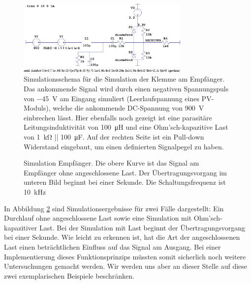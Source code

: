 \begin{figure}[h!tb]
    \centering
    \includegraphics[width=0.75\textwidth]{images/ltspice/jac/shortcircuit-recv.png}
    \caption{
        Simulationsschema f\"ur die Simulation  der Klemme am Empf\"anger. Das
        ankommende  Signal  wird  durch   einen  negativen  Spannungspuls  von
        \SI{-45}{\volt}   am   Eingang   simuliert   (Leerlaufspannung   eines
        PV-Moduls),  welche  die  ankommende DC-Spannung  von  \SI{900}{\volt}
        einbrechen   l\"asst. Hier    ebenfalls   noch   gezeigt    ist   eine
        parasit\"are    Leitungsinduktivit\"at   von    \SI{100}{\micro\henry}
        und   eine   Ohm'sch-kapazitive    Last   von   \SI{1}{\kilo\ohm}   ||
        \SI{100}{\micro\farad}. Auf  der  rechten   Seite  ist  ein  Pull-down
        Widerstand eingebaut, um einen definierten Signalpegel zu haben.%
    }
    \label{fig:ltspice:shortCircuit:receiver}
\end{figure}

\begin{figure}[h!tb]
    \centering
    
    \caption{%
        Simulation   Empf\"anger. Die   obere   Kurve  ist   das   Signal   am
        Empf\"anger  ohne  angeschlossene Last. Der  \"Ubertragungsvorgang  im
        unteren  Bild beginnt  bei einer  Sekunde. Die Schaltungsfrequenz  ist
        \SI{10}{\kilo\hertz}%
    }
    \label{fig:simu:short:recv}
\end{figure}

In Abbildung  \ref{fig:simu:short:recv} sind Simulationsergebnisse  f\"ur zwei
F\"alle  dargestellt: Ein  Durchlauf  ohne   angeschlossene  Last  sowie  eine
Simulation mit  Ohm'sch-kapazitiver Last. Bei der Simulation  mit Last beginnt
der  \"Ubertragungsvorgang  bei einer  Sekunde. Wie  leicht  zu erkennen  ist,
hat  die Art  der  angeschlossenen Last  einen  betr\"achtlichen Einfluss  auf
das  Signal am  Ausgang. Bei  einer  Implementierung dieses  Funktionsprinzips
m\"ussten  somit sicherlich  noch weitere  Untersuchungen gemacht  werden. Wir
werden  uns aber  an dieser  Stelle  auf diese  zwei exemplarischen  Beispiele
beschr\"anken.


